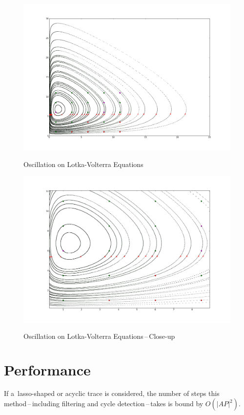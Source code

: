 \documentclass[12pt,twoside,draft]{fithesis}
\begin{document}
\begin{figure}[h]
\center
\includegraphics[scale=0.31,draft=false]{lv_oscillation}
\label{fig:lv}
\caption{Oscillation on Lotka-Volterra Equations}
\end{figure}

\begin{figure}[h]
\center
\includegraphics[scale=0.31,draft=false]{lv_oscillation_closeup}
\label{fig:lv:close}
\caption{Oscillation on Lotka-Volterra Equations\,--\,Close-up}
\end{figure}

\section{Performance}
If a~lasso-shaped or acyclic trace is considered, the number of steps
this method\,--\,including filtering and cycle detection\,--\,takes is
bound by $O(|AP|^2)$\cite{biere}.
\end{document}
